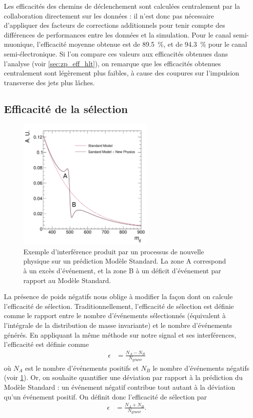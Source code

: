 Les efficacités des chemins de déclenchement sont calculées centralement par la collaboration directement sur les données : il n'est donc pas nécessaire d'appliquer des facteurs de corrections additionnels pour tenir compte des différences de performances entre les données et la simulation. Pour le canal semi-muonique, l'efficacité moyenne obtenue est de \SI{89,5}{\percent}, et de \SI{94,3}{\percent} pour le canal semi-électronique. Si l'on compare ces valeurs aux efficacités obtenues dans l'analyse \zprime (voir \cref{sec:zp_eff_hlt}), on remarque que les efficacités obtenues centralement sont légèrement plus faibles, à cause des coupures sur l'impulsion transverse des jets plus lâches.

\subsection{Efficacité de la sélection} \label{sec:higgs_sel_eff}

\begin{figure}[tbp]
    \centering
    \includegraphics[width=0.6\textwidth]{chapitre8/figs/interferences.pdf}
    \caption{Exemple d'interférence produit par un processus de nouvelle physique sur un prédiction Modèle Standard. La zone A correspond à un excès d'événement, et la zone B à un déficit d'événement par rapport au Modèle Standard.}
    \label{fig:int_eff}
\end{figure}

La présence de poids négatifs nous oblige à modifier la façon dont on calcule l'efficacité de sélection. Traditionnellement, l'efficacité de sélection est définie comme le rapport entre le nombre d'événements sélectionnés (équivalent à l'intégrale de la distribution de masse invariante) et le nombre d'événements générés. En appliquant la même méthode sur notre signal et ses interférences, l'efficacité est définie comme
\begin{align*}
  \epsilon &= \frac{N_A - N_B}{N_\text{généré}}
\end{align*}
où $N_A$ est le nombre d'événements positifs et $N_B$ le nombre d'événements négatifs (voir \cref{fig:int_eff}). Or, on souhaite quantifier une déviation par rapport à la prédiction du Modèle Standard : un événement négatif contribue tout autant à la déviation qu'un événement positif. On définit donc l'efficacité de sélection par
\begin{align*}
  \epsilon &= \frac{N_A + N_B}{N_\text{généré}}.
\end{align*}

